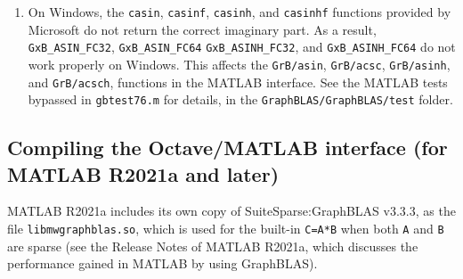 \documentclass[12pt]{article}
\begin{document}
{\begin{enumerate}
    \vspace{-0.1in}
    {\small
    \begin{verbatim}
    cd GraphBLAS/build/Release
    GrB(1) \end{verbatim} }

    \vspace{-0.1in}
    After this step, the GraphBLAS library will be loaded into MATLAB.  You may
    need to add the above lines in your \verb'Documents/MATLAB/startup.m' file,
    so that they are done each time MATLAB starts.  You will also need to do
    this after \verb'clear all' or \verb'clear mex', since those MATLAB
    commands remove all loaded libraries from MATLAB.

    You might also get an error ``the specified procedure cannot be found.''
    This can occur if you have upgraded your GraphBLAS library from a prior
    version, and some of the compiled files \verb'@GrB/private/*.mex*'
    are stale.  Try the command \verb'gbmake all' in the MATLAB Command
    Window, which forces all of the MATLAB interface to be recompiled.
    Or, try deleting all \verb'@GrB/private/*.mex*' files and running
    \verb'gbmake' again.

\item On Windows, the \verb'casin', \verb'casinf', \verb'casinh', and
    \verb'casinhf' functions provided by Microsoft do not return the correct
    imaginary part.  As a result, \verb'GxB_ASIN_FC32', \verb'GxB_ASIN_FC64'
    \verb'GxB_ASINH_FC32', and \verb'GxB_ASINH_FC64' do not work properly on
    Windows.  This affects the \verb'GrB/asin', \verb'GrB/acsc',
    \verb'GrB/asinh', and \verb'GrB/acsch', functions in the MATLAB interface.
    See the MATLAB tests bypassed in \verb'gbtest76.m' for details, in the
    \newline
    \verb'GraphBLAS/GraphBLAS/test' folder.

\end{enumerate}

\subsection{Compiling the Octave/MATLAB interface (for MATLAB R2021a and later)}
\label{R2021a}

MATLAB R2021a includes its own copy of SuiteSparse:GraphBLAS v3.3.3, as the
file \verb'libmwgraphblas.so', which is used for the built-in \verb'C=A*B' when
both \verb'A' and \verb'B' are sparse (see the Release Notes of MATLAB R2021a,
which discusses the performance gained in MATLAB by using GraphBLAS).

}
\end{document}
